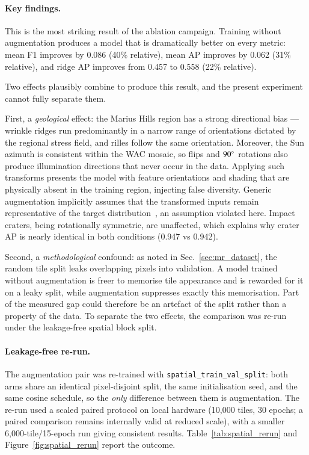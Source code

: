 \documentclass{aa}
\begin{document}
\paragraph{Key findings.}
This is the most striking result of the ablation campaign. Training without augmentation produces a model that is dramatically better on every metric: mean F1 improves by 0.086 (40\% relative), mean AP improves by 0.062 (31\% relative), and ridge AP improves from 0.457 to 0.558 (22\% relative).

Two effects plausibly combine to produce this result, and the present experiment cannot fully separate them.

First, a \emph{geological} effect: the Marius Hills region has a strong directional bias --- wrinkle ridges run predominantly in a narrow range of orientations dictated by the regional stress field, and rilles follow the same orientation. Moreover, the Sun azimuth is consistent within the WAC mosaic, so flips and $90\degree$ rotations also produce illumination directions that never occur in the data. Applying such transforms presents the model with feature orientations and shading that are physically absent in the training region, injecting false diversity. Generic augmentation implicitly assumes that the transformed inputs remain representative of the target distribution~\cite{shorten2019augmentation}, an assumption violated here. Impact craters, being rotationally symmetric, are unaffected, which explains why crater AP is nearly identical in both conditions (0.947 vs 0.942).

Second, a \emph{methodological} confound: as noted in Sec.~\ref{sec:mr_dataset}, the random tile split leaks overlapping pixels into validation. A model trained without augmentation is freer to memorise tile appearance and is rewarded for it on a leaky split, while augmentation suppresses exactly this memorisation. Part of the measured gap could therefore be an artefact of the split rather than a property of the data. To separate the two effects, the comparison was re-run under the leakage-free spatial block split.

\paragraph{Leakage-free re-run.}
The augmentation pair was re-trained with \texttt{spatial\_train\_val\_split}: both arms share an identical pixel-disjoint split, the same initialisation seed, and the same cosine schedule, so the \emph{only} difference between them is augmentation. The re-run used a scaled paired protocol on local hardware (10{,}000 tiles, 30 epochs; a paired comparison remains internally valid at reduced scale), with a smaller 6{,}000-tile/15-epoch run giving consistent results. Table~\ref{tab:spatial_rerun} and Figure~\ref{fig:spatial_rerun} report the outcome.
\end{document}
